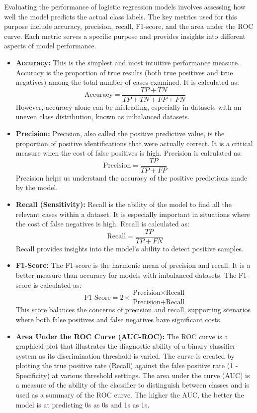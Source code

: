 \documentclass{article}
\theoremstyle{definition}
\theoremstyle{theorem}
\theoremstyle{theorem}
\theoremstyle{theorem}
\theoremstyle{theorem}
\theoremstyle{definition}
\theoremstyle{definition}
\theoremstyle{definition}
\theoremstyle{definition}
\theoremstyle{definition}
\begin{document}
Evaluating the performance of logistic regression models involves assessing how well the model predicts the actual class labels. The key metrics used for this purpose include accuracy, precision, recall, F1-score, and the area under the ROC curve. Each metric serves a specific purpose and provides insights into different aspects of model performance.

\begin{itemize}
    \item \textbf{Accuracy:} This is the simplest and most intuitive performance measure. Accuracy is the proportion of true results (both true positives and true negatives) among the total number of cases examined. It is calculated as:
    \[
    \text{Accuracy} = \frac{TP + TN}{TP + TN + FP + FN}
    \]
    However, accuracy alone can be misleading, especially in datasets with an uneven class distribution, known as imbalanced datasets.

    \item \textbf{Precision:} Precision, also called the positive predictive value, is the proportion of positive identifications that were actually correct. It is a critical measure when the cost of false positives is high. Precision is calculated as:
    \[
    \text{Precision} = \frac{TP}{TP + FP}
    \]
    Precision helps us understand the accuracy of the positive predictions made by the model.

    \item \textbf{Recall (Sensitivity):} Recall is the ability of the model to find all the relevant cases within a dataset. It is especially important in situations where the cost of false negatives is high. Recall is calculated as:
    \[
    \text{Recall} = \frac{TP}{TP + FN}
    \]
    Recall provides insights into the model’s ability to detect positive samples.

    \item \textbf{F1-Score:} The F1-score is the harmonic mean of precision and recall. It is a better measure than accuracy for models with imbalanced datasets. The F1-score is calculated as:
    \[
    \text{F1-Score} = 2 \times \frac{\text{Precision} \times \text{Recall}}{\text{Precision} + \text{Recall}}
    \]
    This score balances the concerns of precision and recall, supporting scenarios where both false positives and false negatives have significant costs.

    \item \textbf{Area Under the ROC Curve (AUC-ROC):} The ROC curve is a graphical plot that illustrates the diagnostic ability of a binary classifier system as its discrimination threshold is varied. The curve is created by plotting the true positive rate (Recall) against the false positive rate (1 - Specificity) at various threshold settings. The area under the curve (AUC) is a measure of the ability of the classifier to distinguish between classes and is used as a summary of the ROC curve. The higher the AUC, the better the model is at predicting 0s as 0s and 1s as 1s.
\end{itemize}
\end{document}

